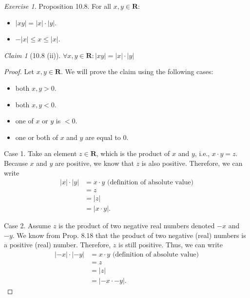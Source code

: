 \documentclass[12pt,oneside]{amsart}
\theoremstyle{remark}
\newtheorem{exer}{Exercise}
\newtheorem{claim}{Claim}[exer]
\newcommand{\bfR}{\mathbf{R}}
\begin{document}
\newpage
\begin{exer}
Proposition 10.8. For all $x, y \in \bfR$:
\begin{itemize}
  \item[ (ii) ] $|xy| = |x| \cdot |y|$.
  \item[ (iii) ] $-|x| \leq x \leq |x|$.
\end{itemize}
\end{exer}
\begin{claim}[10.8 (ii)]
$\forall x, y \in \bfR: |xy| = |x| \cdot |y|$
\end{claim}
\begin{proof}
Let $x, y \in \bfR$. We will prove the claim using the following cases:
\begin{itemize}
  \item[1.] both $x, y > 0$.
  \item[2.] both $x, y < 0$.
  \item[3.] one of $x$ or $y$ is $<0$.
  \item[4.] one or both of $x$ and $y$ are equal to 0.
\end{itemize}

Case 1. Take an element $z \in \bfR$, which is the product of $x$ and $y$, i.e., $x \cdot y = z$. Because $x$ and $y$ are positive, we know that $z$ is also positive. Therefore, we can write
\begin{equation}
\begin{split}
|x| \cdot |y| &= x \cdot y\text{ (definition of absolute value)} \\
              &= z \\
              &= |z| \\
              &= |x \cdot y|.
\end{split}
\end{equation}

Case 2. Assume $z$ is the product of two negative real numbers denoted $-x$ and $-y$. We know from Prop. 8.18 that the product of two negative (real) numbers is a positive (real) number. Therefore, $z$ is still positive. Thus, we can write
\begin{equation}
\begin{split}
|-x| \cdot |-y| &= x \cdot y \text{ (definition of absolute value)} \\
                &= z \\
                &= |z| \\
                &= |-x \cdot -y|.
\end{split}
\end{equation}


\end{proof}
\end{document}

